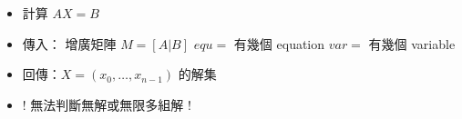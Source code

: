 \begin{itemize}
    \item 計算 $AX = B$
    \item 傳入：
        \subitem 增廣矩陣 $M=[A|B]$
        \subitem $equ=$ 有幾個 equation
        \subitem $var=$ 有幾個 variable
    \item 回傳：$X = (x_0,\dots, x_{n-1})$ 的解集
    \item ! 無法判斷無解或無限多組解 !
\end{itemize}